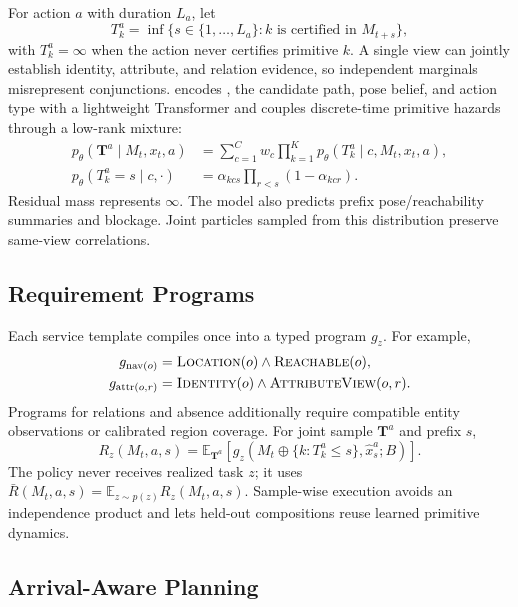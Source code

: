For action $a$ with duration $L_a$, let
\begin{equation}
T_k^a=\inf\{s\in\{1,\ldots,L_a\}:k\text{ is certified in }M_{t+s}\},
\end{equation}
with $T_k^a=\infty$ when the action never certifies primitive $k$.
A single view can jointly establish identity, attribute, and relation evidence, so independent marginals misrepresent conjunctions.
\jet{} encodes \rfm{}, the candidate path, pose belief, and action type with a lightweight Transformer and couples discrete-time primitive hazards through a low-rank mixture:
\begin{align}
p_\theta(\mathbf{T}^{a}\mid M_t,x_t,a)
&=\sum_{c=1}^{C}w_c\prod_{k=1}^{K}p_\theta(T_k^a\mid c,M_t,x_t,a),\\
p_\theta(T_k^a=s\mid c,\cdot)
&=\alpha_{kcs}\prod_{r<s}(1-\alpha_{kcr}).
\end{align}
Residual mass represents $\infty$.
The model also predicts prefix pose/reachability summaries and blockage.
Joint particles sampled from this distribution preserve same-view correlations.

\subsection{Requirement Programs}

Each service template compiles once into a typed program $g_z$.
For example,
\begin{align}
g_{\mathrm{nav}(o)}&=\textsc{Location}(o)\wedge\textsc{Reachable}(o),\\
g_{\mathrm{attr}(o,r)}&=\textsc{Identity}(o)\wedge\textsc{AttributeView}(o,r).
\end{align}
Programs for relations and absence additionally require compatible entity observations or calibrated region coverage.
For joint sample $\mathbf{T}^a$ and prefix $s$,
\begin{equation}
\label{eq:task-readiness}
R_z(M_t,a,s)=\mathbb{E}_{\mathbf{T}^a}
\left[g_z\!\left(M_t\oplus\{k:T_k^a\le s\},\hat x_s^a;B\right)\right].
\end{equation}
The policy never receives realized task $z$; it uses
$\bar R(M_t,a,s)=\mathbb{E}_{z\sim p(z)}R_z(M_t,a,s)$.
Sample-wise execution avoids an independence product and lets held-out compositions reuse learned primitive dynamics.

\subsection{Arrival-Aware Planning}

